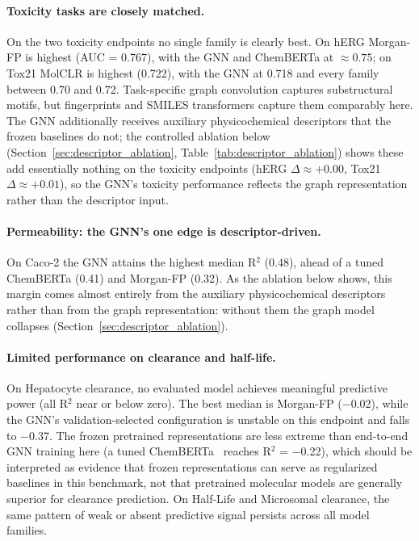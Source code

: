 \documentclass[journal]{IEEEtran}
\begin{document}
\paragraph{Toxicity tasks are closely matched.}
On the two toxicity endpoints no single family is clearly best. On hERG Morgan-FP is highest (AUC = 0.767), with the GNN and ChemBERTa at $\approx 0.75$; on Tox21 MolCLR is highest (0.722), with the GNN at 0.718 and every family between 0.70 and 0.72. Task-specific graph convolution captures substructural motifs, but fingerprints and SMILES transformers capture them comparably here. The GNN additionally receives auxiliary physicochemical descriptors that the frozen baselines do not; the controlled ablation below (Section~\ref{sec:descriptor_ablation}, Table~\ref{tab:descriptor_ablation}) shows these add essentially nothing on the toxicity endpoints (hERG $\Delta \approx +0.00$, Tox21 $\Delta \approx +0.01$), so the GNN's toxicity performance reflects the graph representation rather than the descriptor input.

\paragraph{Permeability: the GNN's one edge is descriptor-driven.}
On Caco-2 the GNN attains the highest median R$^2$ (0.48), ahead of a tuned ChemBERTa (0.41) and Morgan-FP (0.32). As the ablation below shows, this margin comes almost entirely from the auxiliary physicochemical descriptors rather than from the graph representation: without them the graph model collapses (Section~\ref{sec:descriptor_ablation}).

\paragraph{Limited performance on clearance and half-life.}
On Hepatocyte clearance, no evaluated model achieves meaningful predictive power (all R$^2$ near or below zero). The best median is Morgan-FP ($-$0.02), while the GNN's validation-selected configuration is unstable on this endpoint and falls to $-$0.37. The frozen pretrained representations are less extreme than end-to-end GNN training here (a tuned ChemBERTa~\cite{chemberta2} reaches R$^2$ = $-$0.22), which should be interpreted as evidence that frozen representations can serve as regularized baselines in this benchmark, not that pretrained molecular models are generally superior for clearance prediction. On Half-Life and Microsomal clearance, the same pattern of weak or absent predictive signal persists across all model families.
\end{document}

